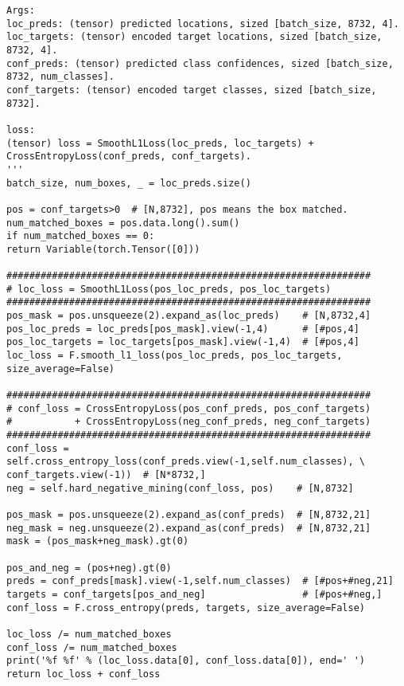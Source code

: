 \begin{lstlisting}
Args:
loc_preds: (tensor) predicted locations, sized [batch_size, 8732, 4].
loc_targets: (tensor) encoded target locations, sized [batch_size, 8732, 4].
conf_preds: (tensor) predicted class confidences, sized [batch_size, 8732, num_classes].
conf_targets: (tensor) encoded target classes, sized [batch_size, 8732].

loss:
(tensor) loss = SmoothL1Loss(loc_preds, loc_targets) + CrossEntropyLoss(conf_preds, conf_targets).
'''
batch_size, num_boxes, _ = loc_preds.size()

pos = conf_targets>0  # [N,8732], pos means the box matched.
num_matched_boxes = pos.data.long().sum()
if num_matched_boxes == 0:
return Variable(torch.Tensor([0]))

################################################################
# loc_loss = SmoothL1Loss(pos_loc_preds, pos_loc_targets)
################################################################
pos_mask = pos.unsqueeze(2).expand_as(loc_preds)    # [N,8732,4]
pos_loc_preds = loc_preds[pos_mask].view(-1,4)      # [#pos,4]
pos_loc_targets = loc_targets[pos_mask].view(-1,4)  # [#pos,4]
loc_loss = F.smooth_l1_loss(pos_loc_preds, pos_loc_targets, size_average=False)

################################################################
# conf_loss = CrossEntropyLoss(pos_conf_preds, pos_conf_targets)
#           + CrossEntropyLoss(neg_conf_preds, neg_conf_targets)
################################################################
conf_loss = self.cross_entropy_loss(conf_preds.view(-1,self.num_classes), \
conf_targets.view(-1))  # [N*8732,]
neg = self.hard_negative_mining(conf_loss, pos)    # [N,8732]

pos_mask = pos.unsqueeze(2).expand_as(conf_preds)  # [N,8732,21]
neg_mask = neg.unsqueeze(2).expand_as(conf_preds)  # [N,8732,21]
mask = (pos_mask+neg_mask).gt(0)

pos_and_neg = (pos+neg).gt(0)
preds = conf_preds[mask].view(-1,self.num_classes)  # [#pos+#neg,21]
targets = conf_targets[pos_and_neg]                 # [#pos+#neg,]
conf_loss = F.cross_entropy(preds, targets, size_average=False)

loc_loss /= num_matched_boxes
conf_loss /= num_matched_boxes
print('%f %f' % (loc_loss.data[0], conf_loss.data[0]), end=' ')
return loc_loss + conf_loss
\end{lstlisting}
